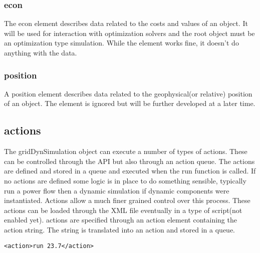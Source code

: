 \documentclass[12pt]{article} %
\begin{document}
\subsubsection{econ}
The econ element describes data related to the costs and values of an object.  It will be used for interaction with optimization solvers and the root object must be an optimization type simulation.  While the element works fine, it doesn't do anything with the data.

\subsubsection{position}
A position element describes data related to the geophysical(or relative) position of an object.  The element is ignored but will be further developed at a later time.

\subsection{actions}\label{section:action}
The gridDynSimulation object can execute a number of types of actions.  These can be controlled through the API but also through an action queue.  The actions are defined and stored in a queue and executed when the run function is called.  If no actions are defined some logic is in place to do something sensible, typically run a power flow then a dynamic simulation if dynamic components were instantiated.  Actions allow a much finer grained control over this process.  These actions can be loaded through the XML file eventually in a type of script(not enabled yet).
actions are specified through an action element containing the action string.  The string is translated into an action and stored in a queue.
\begin{verbatim}
<action>run 23.7</action>
\end{verbatim}
\end{document}
